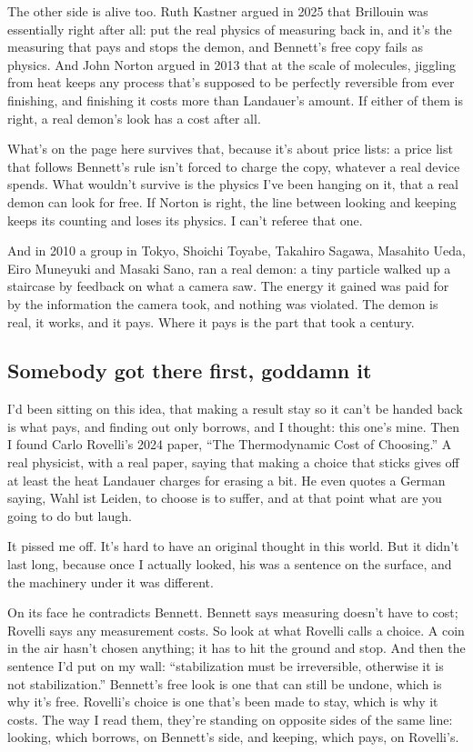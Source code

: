 \documentclass[11pt,twoside]{article}
\theoremstyle{thielethm}
\theoremstyle{thieledef}
\theoremstyle{thieledef}
\theoremstyle{thieledef}
\theoremstyle{thielethm}
\theoremstyle{thieleobs}
\theoremstyle{thielethm}
\begin{document}
The other side is alive too. Ruth Kastner argued in 2025 that Brillouin was essentially right after all: put the real physics of measuring back in, and it's the measuring that pays and stops the demon, and Bennett's free copy fails as physics. And John Norton argued in 2013 that at the scale of molecules, jiggling from heat keeps any process that's supposed to be perfectly reversible from ever finishing, and finishing it costs more than Landauer's amount. If either of them is right, a real demon's look has a cost after all.

What's on the page here survives that, because it's about price lists: a price list that follows Bennett's rule isn't forced to charge the copy, whatever a real device spends. What wouldn't survive is the physics I've been hanging on it, that a real demon can look for free. If Norton is right, the line between looking and keeping keeps its counting and loses its physics. I can't referee that one.

And in 2010 a group in Tokyo, Shoichi Toyabe, Takahiro Sagawa, Masahito Ueda, Eiro Muneyuki and Masaki Sano, ran a real demon: a tiny particle walked up a staircase by feedback on what a camera saw. The energy it gained was paid for by the information the camera took, and nothing was violated. The demon is real, it works, and it pays. Where it pays is the part that took a century.

\subsection{Somebody got there first, goddamn it}

I'd been sitting on this idea, that making a result stay so it can't be handed back is what pays, and finding out only borrows, and I thought: this one's mine. Then I found Carlo Rovelli's 2024 paper, ``The Thermodynamic Cost of Choosing.'' A real physicist, with a real paper, saying that making a choice that sticks gives off at least the heat Landauer charges for erasing a bit. He even quotes a German saying, Wahl ist Leiden, to choose is to suffer, and at that point what are you going to do but laugh.

It pissed me off. It's hard to have an original thought in this world. But it didn't last long, because once I actually looked, his was a sentence on the surface, and the machinery under it was different.

On its face he contradicts Bennett. Bennett says measuring doesn't have to cost; Rovelli says any measurement costs. So look at what Rovelli calls a choice. A coin in the air hasn't chosen anything; it has to hit the ground and stop. And then the sentence I'd put on my wall: ``stabilization must be irreversible, otherwise it is not stabilization.'' Bennett's free look is one that can still be undone, which is why it's free. Rovelli's choice is one that's been made to stay, which is why it costs. The way I read them, they're standing on opposite sides of the same line: looking, which borrows, on Bennett's side, and keeping, which pays, on Rovelli's.
\end{document}
